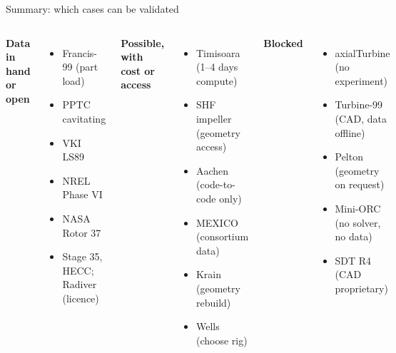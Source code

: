 \documentclass[aspectratio=169,10pt]{beamer}
\begin{document}
\begin{frame}{Summary: which cases can be validated}
\small
\begin{columns}[T]
\textbf{\textcolor{ok}{Data in hand or open}}
\begin{itemize}
\item Francis-99 (part load)
\item PPTC cavitating
\item VKI LS89
\item NREL Phase VI
\item NASA Rotor 37
\item Stage 35, HECC; Radiver (licence)
\end{itemize}
\textbf{\textcolor{part}{Possible, with cost or access}}
\begin{itemize}
\item Timisoara (1--4 days compute)
\item SHF impeller (geometry access)
\item Aachen (code-to-code only)
\item MEXICO (consortium data)
\item Krain (geometry rebuild)
\item Wells (choose rig)
\end{itemize}
\textbf{\textcolor{bad}{Blocked}}
\begin{itemize}
\item axialTurbine (no experiment)
\item Turbine-99 (CAD, data offline)
\item Pelton (geometry on request)
\item Mini-ORC (no solver, no data)
\item SDT R4 (CAD proprietary)
\end{itemize}
\end{columns}
\end{frame}
\end{document}
